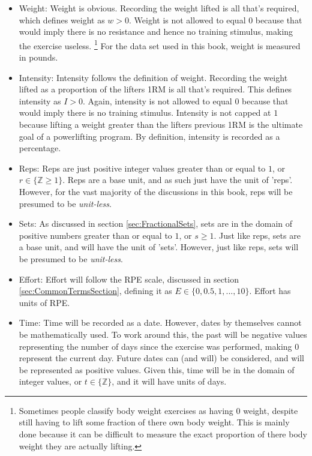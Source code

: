 \begin{itemize}
	\item Weight: Weight is obvious. Recording the weight lifted is all that's required, which defines weight as $w>0$. Weight is not allowed to equal $0$ because that would imply there is no resistance and hence no training stimulus, making the exercise useless. \footnote{Sometimes people classify body weight exercises as having $0$ weight, despite still having to lift some fraction of there own body weight. This is mainly done because it can be difficult to measure the exact proportion of there body weight they are actually lifting.} For the data set used in this book, weight is measured in pounds.
	
	\item Intensity: Intensity follows the definition of weight. Recording the weight lifted as a proportion of the lifters 1RM is all that's required. This defines intensity as $I>0$. Again, intensity is not allowed to equal $0$ because that would imply there is no training stimulus. Intensity is not capped at $1$ because lifting a weight greater than the lifters previous 1RM is the ultimate goal of a powerlifting program. By definition, intensity is recorded as a percentage.
	
	\item Reps: Reps are just positive integer values greater than or equal to $1$, or $r\in \{ \mathbb{Z} \ge 1 \}$. Reps are a base unit, and as such just have the unit of 'reps'. However, for the vast majority of the discussions in this book, reps will be presumed to be \textit{unit-less}.
	
	\item Sets: As discussed in section \ref{sec:FractionalSets}, sets are in the domain of positive numbers greater than or equal to $1$, or $s\ge 1$. Just like reps, sets are a base unit, and will have the unit of 'sets'. However, just like reps, sets will be presumed to be \textit{unit-less}.
	
	\item Effort: Effort will follow the RPE scale, discussed in section \ref{sec:CommonTermsSection}, defining it as $E\in \{0,0.5,1,...,10\}$. Effort has units of RPE.
	
	\item Time: Time will be recorded as a date. However, dates by themselves cannot be mathematically used. To work around this, the past will be negative values representing the number of days since the exercise was performed, making $0$ represent the current day. Future dates can (and will) be considered, and will be represented as positive values. Given this, time will be in the domain of integer values, or $t\in \{ \mathbb{Z} \}$, and it will have units of days.
	

\end{itemize}
